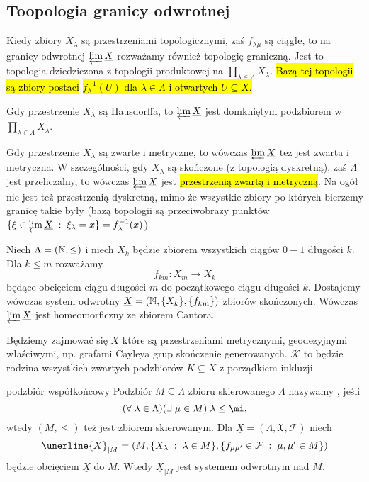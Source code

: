\subsection{Toopologia granicy odwrotnej}

Kiedy zbiory $X_\lambda$ są przestrzeniami topologicznymi, zaś $f_{\lambda\mu}$ są ciągłe, to na granicy odwrotnej $\varprojlim\underline{X}$ rozważamy również topologię graniczną. Jest to topologia dziedziczona z topologii produktowej na $\prod_{\lambda\in\Lambda}X_\lambda$. \hl{Bazą tej topologii są zbiory postaci }\hl{$f_\lambda^{-1}(U)$ dla $\lambda\in\Lambda$ i otwartych $U\subseteq X$.}

\begin{fact}{}{}
  Gdy przestrzenie $X_\lambda$ są Hausdorffa, to $\varprojlim \underline{X}$ jest domkniętym podzbiorem w $\prod_{\lambda\in\Lambda}X_\lambda$.
\end{fact}

Gdy przestrzenie $X_\lambda$ są zwarte i metryczne, to wówczas $\varprojlim\underline{X}$ też jest zwarta i metryczna. W szczególności, gdy $X_\lambda$ są skończone (z topologią dyskretną), zaś $\Lambda$ jest przeliczalny, to wówczas $\varprojlim\underline{X}$ jest \hl{przestrzenią zwartą i metryczną}. Na ogół nie jest też przestrzenią dyskretną, mimo że wszystkie zbiory po których bierzemy granicę takie były (bazą topologii są przeciwobrazy punktów $\{\xi\in\varprojlim\underline{X}\;:\;\xi_\lambda=x\}=f^{-1}_\lambda(x)$).

\begin{example}{}{}
  Niech $\Lambda=(\mathbb{N}, \leq)$ i niech $X_k$ będzie zbiorem wszystkich ciągów $0-1$ długości $k$. Dla $k\leq m$ rozważamy 
  $$f_{km}:X_m\to X_k$$
  będące obcięciem ciągu długości $m$ do początkowego ciągu długości $k$. Dostajemy wówczas system odwrotny $\underline{X}=(\mathbb{N}, \{X_k\}, \{f_{km}\})$ zbiorów skończonych. Wówczas $\varprojlim\underline{X}$ jest homeomorficzny ze zbiorem Cantora.
\end{example}

Będziemy zajmować się $X$ które są przestrzeniami metrycznymi, geodezyjnymi właściwymi, np. grafami Cayleya grup skończenie generowanych. $\mathcal{K}$ to będzie rodzina wszystkich zwartych podzbiorów $K\subseteq X$ z porządkiem inkluzji.

\begin{definition}{podzbiór współkońcowy}{}
  Podzbiór $M\subseteq\Lambda$ zbioru skierowanego $\Lambda$ nazywamy , jeśli 
  $$(\forall\;\lambda\in\Lambda)(\exists\;\mu\in M)\;\lambda\leq\mi,$$ 
  wtedy $(M, \leq)$ też jest zbiorem skierowanym. Dla $\underline{X}=(\Lambda, \mathfrak{X}, \mathcal{F})$ niech 
  $$\unerline{X}_{|M}=(M, \{X_\lambda\;:\;\lambda\in M\}, \{f_{\mu\mu'}\in\mathcal{F}\;:\;\mu,\mu'\in M\})$$
  będzie obcięciem $\underline{X}$ do $M$. Wtedy $\underline{X}_{|M}$ jest systemem odwrotnym nad $M$.
\end{definition}


